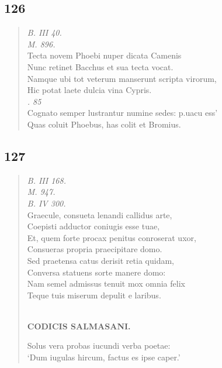 \documentclass[11pt, a4paper]{report}
\begin{document}
            \subsection*{126}
      \begin{verse}
      \textit{B. III 40.} \\ \textit{M. 896.} \\ Tecta novem Phoebi nuper dicata Camenis \\ Nunc retinet Bacchus et sua tecta vocat. \\ Namque ubi tot veterum manserunt scripta virorum, \\ Hic potat laete dulcia vina Cypris. \\ \textit{. 85} \\ Cognato semper lustrantur numine sedes: p.uacu ess’ \\ Quas coluit Phoebus, has colit et Bromius. \\ 
      \end{verse}
  
            \subsection*{127}
      \begin{verse}
      \textit{B. III 168.} \\ \textit{M. 947.} \\ \textit{B. IV 300.} \\ Graecule, consueta lenandi callidus arte, \\ Coepisti adductor coniugis esse tuae, \\ Et, quem forte procax penitus conroserat uxor, \\ Consueras propria praecipitare domo. \\ Sed praetensa catus derisit retia quidam, \\ Conversa statuens sorte manere domo: \\ Nam semel admissus tenuit mox omnia felix \\ Teque tuis miserum depulit e laribus. \\ 
        ﻿\pagebreak 
    \begin{center} \textbf{CODICIS SALMASANI.} \end{center}Solus vera probas iucundi verba poetae: \\ ‘Dum iugulas hircum, factus es ipse caper.’ \\ 
      \end{verse}
  
\end{document}
